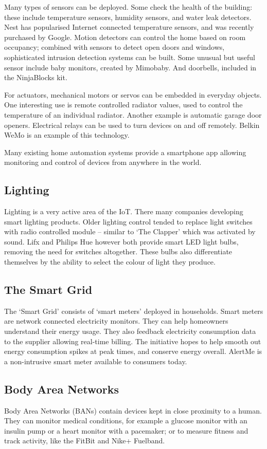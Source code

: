 \documentclass[10pt,journal,compsoc]{IEEEtran}
\begin{document}
Many types of sensors can be deployed. Some check the health of the building:
these include temperature sensors, humidity sensors, and water leak detectors.
Nest has popularised Internet connected temperature sensors, and was recently
purchased by Google. Motion detectors can control the home based on
room occupancy; combined with sensors to detect open doors and windows,
sophisticated intrusion detection systems can be built. Some unusual but useful
sensor include baby monitors, created by Mimobaby. And doorbells, included in
the NinjaBlocks kit. 

For actuators, mechanical motors or servos can be embedded in everyday objects.
One interesting use is remote controlled radiator values, used to control the
temperature of an individual radiator. Another example is automatic garage door
openers. Electrical relays can be used to turn devices on and off remotely.
Belkin WeMo is an example of this technology.

Many existing home automation systems provide a smartphone app allowing
monitoring and control of devices from anywhere in the world. 

\subsection{Lighting}
Lighting is a very active area of the IoT. There many companies developing
smart lighting products. Older lighting control tended to replace light
switches with radio controlled module -- similar to `The Clapper' which was
activated by sound.  Lifx and Philips Hue however both provide smart LED light
bulbs, removing the need for switches altogether. These bulbs also
differentiate themselves by the ability to select the colour of light they
produce.  

\subsection{The Smart Grid}
The `Smart Grid' consists of `smart meters' deployed in households.  Smart
meters are network connected electricity monitors. They can help homeowners
understand their energy usage. They also feedback electricity consumption data
to the supplier allowing real-time billing. The initiative hopes to help smooth
out energy consumption spikes at peak times, and conserve energy overall.
AlertMe is a non-intrusive smart meter available to consumers today. 

\subsection{Body Area Networks}
Body Area Networks (BANs) contain devices kept in close proximity to a human.
They can monitor medical conditions, for example a glucose monitor with an
insulin pump or a heart monitor with a pacemaker; or to measure fitness and
track activity, like the FitBit and Nike+ Fuelband. 
\end{document}
